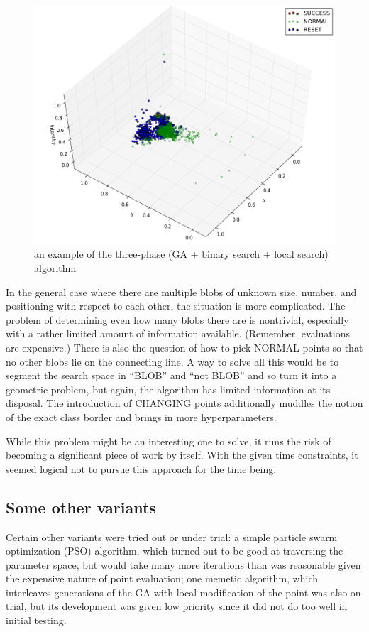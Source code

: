 \documentclass[times, utf8, diplomski]{fer}
\begin{document}
\begin{figure}[htbp]
    \centering
    \includegraphics[width=\textwidth]{images/GA-binary-local.png}
    \caption{an example of the three-phase (GA + binary search + local search)
             algorithm
    }
    \label{fig:three-phase-example}
\end{figure}


In the general case where there are multiple blobs of unknown size, number,
and positioning with respect to each other, the situation is more complicated.
The problem of determining even how many blobs there are is nontrivial,
especially with a rather limited amount of information available. (Remember,
evaluations are expensive.) There is also the question of how to pick NORMAL
points so that no other blobs lie on the connecting line. A way to solve all
this would be to segment the search space in ``BLOB'' and ``not BLOB'' and so turn
it into a geometric problem, but again, the algorithm has limited information
at its disposal. The introduction of CHANGING points additionally muddles the
notion of the exact class border and brings in more hyperparameters. 

While this problem might be an interesting one to solve, it runs the risk of
becoming a significant piece of work by itself. With the given time constraints,
it seemed logical not to pursue this approach for the time being.


\subsection{Some other variants}
Certain other variants were tried out or under trial: a simple particle swarm
optimization (PSO) algorithm, which turned out to be good at traversing the
parameter space, but would take many more iterations than was reasonable given
the expensive nature of point evaluation; one memetic algorithm, which interleaves
generations of the GA with local modification of the point was also on trial, but
its development was given low priority since it did not do too well in initial
testing.
\end{document}
